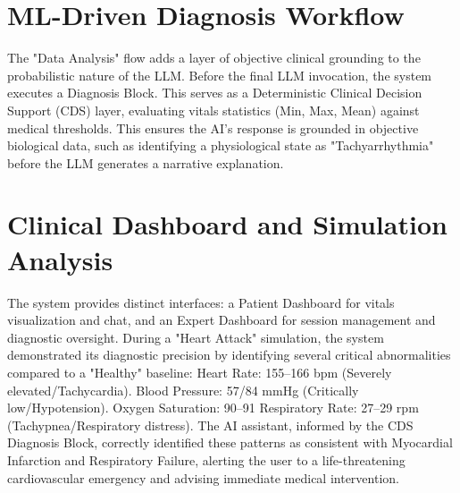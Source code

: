 \documentclass[runningheads]{llncs}
\begin{document}
\section{ML-Driven Diagnosis Workflow}
The "Data Analysis" flow adds a layer of objective clinical grounding to the probabilistic nature of the LLM. Before the final LLM invocation, the system executes a Diagnosis Block. This serves as a Deterministic Clinical Decision Support (CDS) layer, evaluating vitals statistics (Min, Max, Mean) against medical thresholds. This ensures the AI's response is grounded in objective biological data, such as identifying a physiological state as "Tachyarrhythmia" before the LLM generates a narrative explanation.
\section{Clinical Dashboard and Simulation Analysis}
The system provides distinct interfaces: a Patient Dashboard for vitals visualization and chat, and an Expert Dashboard for session management and diagnostic oversight.
During a "Heart Attack" simulation, the system demonstrated its diagnostic precision by identifying several critical abnormalities compared to a "Healthy" baseline:
Heart Rate: 155–166 bpm (Severely elevated/Tachycardia).
Blood Pressure: 57/84 mmHg (Critically low/Hypotension).
Oxygen Saturation: 90–91%
Respiratory Rate: 27–29 rpm (Tachypnea/Respiratory distress).
The AI assistant, informed by the CDS Diagnosis Block, correctly identified these patterns as consistent with Myocardial Infarction and Respiratory Failure, alerting the user to a life-threatening cardiovascular emergency and advising immediate medical intervention.
\end{document}
